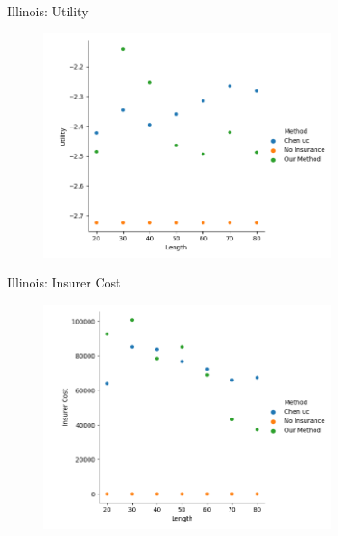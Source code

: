 \documentclass{beamer}
\begin{document}
\begin{frame}{Illinois: Utility}
    \begin{figure}
        \includegraphics[width=0.75\textwidth]{../../../output/figures/Evaluation 2/Illinois_Utility_Length_ml1.png}
    \end{figure}
\end{frame}

\begin{frame}{Illinois: Insurer Cost}
    \begin{figure}
        \includegraphics[width=0.75\textwidth]{../../../output/figures/Evaluation 2/Illinois_Insurer Cost_Length_ml1.png}
    \end{figure}
\end{frame}
\end{document}
